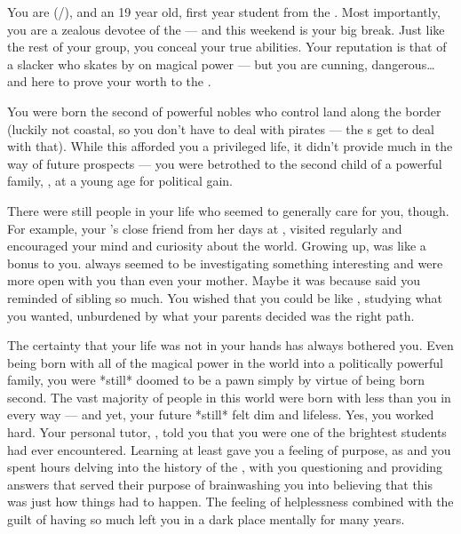 \documentclass[char]{GL2020}
\begin{document}
\name{\cChupStudent{}}
 
You are \cChupStudent{\full} (\cChupStudent{\they}/\cChupStudent{\them}), and an 19 year old, first year student from the \pFarm{}. Most importantly, you are a zealous devotee of the \pGoaties{} — and this weekend is your big break. Just like the rest of your group, you conceal your true abilities. Your reputation is that of a slacker who skates by on \cChupStudent{\their} magical power — but you are cunning, dangerous\ldots and here to prove your worth to the \Goaties{}.
 
You were born the second \cChupStudent{\offspring} of powerful nobles who control land along the \pTech{} border (luckily not coastal, so you don't have to deal with pirates — the \cWildCard{\formal}s get to deal with that). While this afforded you a privileged life, it didn't provide much in the way of future prospects — you were betrothed to the second child of a powerful \pTech{} family, \cHeir{\full}, at a young age for political gain. 

There were still people in your life who seemed to generally care for you, though. For example, your \cWildCardFriend{\parent}’s close friend from her days at \pSchool{},  \cWildCard{} visited regularly and encouraged your mind and curiosity about the world. Growing up, \cWildCard{} was like a bonus \cWildCard{\auncle} to you. \cWildCard{\They} always seemed to be investigating something interesting and were more open with you than even your mother. Maybe it was because  \cWildCard{\they} said you reminded \cWildCard{\them} of \cWildCard{\their} sibling so much. You wished that you could be like \cWildCard{\them}, studying what you wanted, unburdened by what your parents decided was the right path.

The certainty that your life was not in your hands has always bothered you. Even being born with all of the magical power in the world into a politically powerful family, you were *still* doomed to be a pawn simply by virtue of being born second. The vast majority of people in this world were born with less than you in every way — and yet, your future *still* felt dim and lifeless. Yes, you worked hard. Your personal tutor, \cHistory{\full}, told you that you were one of the brightest students \cHistory{\they} had ever encountered. Learning at least gave you a feeling of purpose, as \cHistory{} and you spent hours delving into the history of the \pFarm{}, with you questioning and \cHistory{\them} providing answers that served their purpose of brainwashing you into believing that this was just how things had to happen. The feeling of helplessness combined with the guilt of having so much left you in a dark place mentally for many years.  
 
\end{document}
